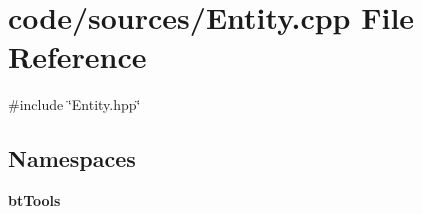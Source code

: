 \section{code/sources/\+Entity.cpp File Reference}
\label{_entity_8cpp}
{\ttfamily \#include \char`\"{}Entity.\+hpp\char`\"{}}\newline
\subsection*{Namespaces}
\begin{DoxyCompactItemize}
\item 
 \textbf{ bt\+Tools}
\end{DoxyCompactItemize}
